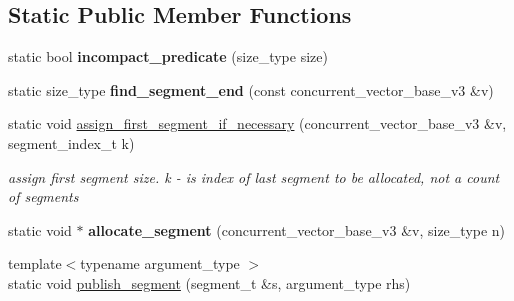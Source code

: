 \subsection*{Static Public Member Functions}
\begin{DoxyCompactItemize}
\item 
\hypertarget{classtbb_1_1internal_1_1concurrent__vector__base__v3_1_1helper_af8b33b18f5eab370c9915f1f0c22503e}{}static bool {\bfseries incompact\+\_\+predicate} (size\+\_\+type size)\label{classtbb_1_1internal_1_1concurrent__vector__base__v3_1_1helper_af8b33b18f5eab370c9915f1f0c22503e}

\item 
\hypertarget{classtbb_1_1internal_1_1concurrent__vector__base__v3_1_1helper_add3df3e1829916023d39bc38b58045fd}{}static size\+\_\+type {\bfseries find\+\_\+segment\+\_\+end} (const concurrent\+\_\+vector\+\_\+base\+\_\+v3 \&v)\label{classtbb_1_1internal_1_1concurrent__vector__base__v3_1_1helper_add3df3e1829916023d39bc38b58045fd}

\item 
\hypertarget{classtbb_1_1internal_1_1concurrent__vector__base__v3_1_1helper_a7c21850aac02edc06d2a84b3c261c1ea}{}static void \hyperlink{classtbb_1_1internal_1_1concurrent__vector__base__v3_1_1helper_a7c21850aac02edc06d2a84b3c261c1ea}{assign\+\_\+first\+\_\+segment\+\_\+if\+\_\+necessary} (concurrent\+\_\+vector\+\_\+base\+\_\+v3 \&v, segment\+\_\+index\+\_\+t k)\label{classtbb_1_1internal_1_1concurrent__vector__base__v3_1_1helper_a7c21850aac02edc06d2a84b3c261c1ea}

\begin{DoxyCompactList}\small\item\em assign first segment size. k -\/ is index of last segment to be allocated, not a count of segments \end{DoxyCompactList}\item 
\hypertarget{classtbb_1_1internal_1_1concurrent__vector__base__v3_1_1helper_abc9b42f80c282fe57a98f7407d52a033}{}static void $\ast$ {\bfseries allocate\+\_\+segment} (concurrent\+\_\+vector\+\_\+base\+\_\+v3 \&v, size\+\_\+type n)\label{classtbb_1_1internal_1_1concurrent__vector__base__v3_1_1helper_abc9b42f80c282fe57a98f7407d52a033}

\item 
\hypertarget{classtbb_1_1internal_1_1concurrent__vector__base__v3_1_1helper_aa6a138a09384f9cc92fda2966dbf4c43}{}{\footnotesize template$<$typename argument\+\_\+type $>$ }\\static void \hyperlink{classtbb_1_1internal_1_1concurrent__vector__base__v3_1_1helper_aa6a138a09384f9cc92fda2966dbf4c43}{publish\+\_\+segment} (segment\+\_\+t \&s, argument\+\_\+type rhs)\label{classtbb_1_1internal_1_1concurrent__vector__base__v3_1_1helper_aa6a138a09384f9cc92fda2966dbf4c43}


\end{DoxyCompactItemize}

